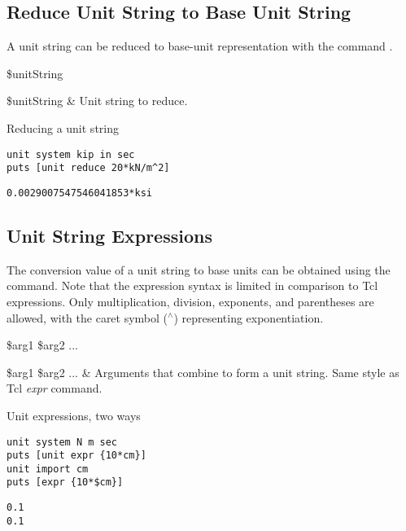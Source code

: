 \documentclass{article}
\newcommand{\caret}{$^\wedge$}
\begin{document}
\subsection{Reduce Unit String to Base Unit String}
A unit string can be reduced to base-unit representation with the command .
\begin{syntax}
 \$unitString
\end{syntax}
\begin{args}
\$unitString & Unit string to reduce.
\end{args}

\begin{example}{Reducing a unit string}
\begin{lstlisting}
unit system kip in sec
puts [unit reduce 20*kN/m^2]
\end{lstlisting}
\tcblower
\begin{lstlisting}
0.0029007547546041853*ksi
\end{lstlisting}
\end{example}

\subsection{Unit String Expressions}
The conversion value of a unit string to base units can be obtained using the  command.
Note that the expression syntax is limited in comparison to Tcl expressions. 
Only multiplication, division, exponents, and parentheses are allowed, with the caret symbol (\caret) representing exponentiation.
\begin{syntax}
 \$arg1 \$arg2 ...
\end{syntax}
\begin{args}
\$arg1 \$arg2 ... & Arguments that combine to form a unit string. Same style as Tcl \textit{expr} command.
\end{args}

\begin{example}{Unit expressions, two ways}
\begin{lstlisting}
unit system N m sec
puts [unit expr {10*cm}]
unit import cm
puts [expr {10*$cm}]
\end{lstlisting}
\tcblower
\begin{lstlisting}
0.1
0.1
\end{lstlisting}
\end{example}

\clearpage
\end{document}
